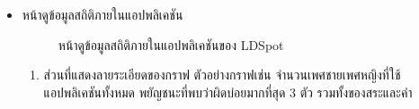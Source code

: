 \documentclass[12pt,oneside,openright,a4paper]{cpe-thai-project}
\begin{document}
\begin{itemize}
  \item หน้าดูข้อมูลสถิติภายในแอปพลิเคชัน
    \begin{figure}[!ht]\centering
      \setlength{\fboxrule}{0.2mm} %
      \setlength{\fboxsep}{1cm}
      \caption{หน้าดูข้อมูลสถิติภายในแอปพลิเคชันของ LDSpot}\label{fig:statapplication}
  \end{figure}
  \begin{enumerate}
    \item ส่วนที่แสดงลายระเอียดของกราฟ ตัวอย่างกราฟเช่น จำนวนเพศชายเพศหญิงที่ใช้แอปพลิเคชันทั้งหมด พยัญชนะที่พบว่าผิดบ่อยมากที่สุด 3 ตัว รวมทั้งของสระและคำ
  \end{enumerate}
\end{itemize}
\newpage
\end{document}
